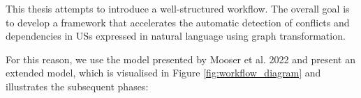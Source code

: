 This thesis attempts to introduce a well-structured workflow. The overall goal is to develop a framework that accelerates the automatic detection of conflicts and dependencies in USs expressed in natural language using graph transformation.

For this reason, we use the model presented by Mooser et al. 2022 and present an extended model, which is visualised in Figure \ref{fig:workflow_diagram} and illustrates the subsequent phases:

